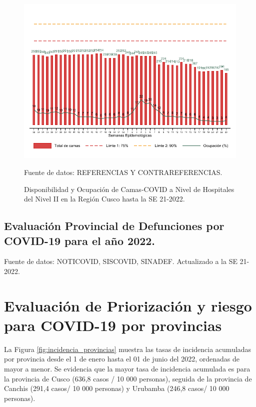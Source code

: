 \documentclass[12pt,a4paper,openany]{book}
\begin{document}
	\begin{figure}[h]
		\caption{Disponibilidad y Ocupación de Camas-COVID a Nivel de Hospitales del Nivel II en la Región Cusco hasta la SE 21-2022.}\label{fig:ocupacion_2nivel}
		\begin{center}
			\includegraphics[width=0.95\linewidth]{../figuras/nivel_2.pdf}
		\end{center}
		{\footnotesize {Fuente de datos: REFERENCIAS Y CONTRAREFERENCIAS.}}
	\end{figure}
	\clearpage
	\begin{landscape}
		
		\subsection*{Evaluación Provincial de Defunciones por COVID-19 para el año 2022.} 
		
		
		
		
		{\footnotesize Fuente de datos: NOTICOVID, SISCOVID, SINADEF. Actualizado a la SE 21-2022.}
		
		\noindent 
		
	\end{landscape}
	
	
	\clearpage
	
	\section*{Evaluación de Priorización y riesgo para COVID-19 por provincias}
	\noindent La Figura \ref{fig:incidencia_provincias} muestra las tasas de incidencia acumuladas por provincia desde el 1 de enero hasta el 01 de junio del 2022, ordenadas de mayor a menor. Se evidencia que la mayor tasa de incidencia acumulada es para la provincia de Cusco (636,8 casos / 10 000 personas), seguida de la provincia de Canchis (291,4 casos/ 10 000 personas) y Urubamba (246,8 casos/ 10 000 personas).
	
\end{document}
